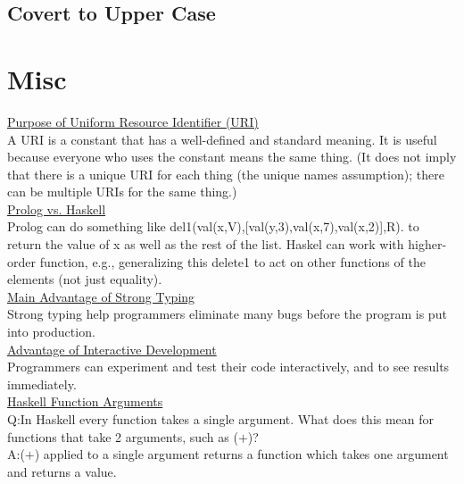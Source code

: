\documentclass[10pt,landscape,a4paper]{article}
\begin{document}
\begin{multicols*}{5}
\subsection*{Covert to Upper Case}

\section{Misc}
\underline{Purpose of Uniform Resource Identifier (URI)} \\
A URI is a constant that has a well-defined and standard
meaning. It is useful because everyone who uses the constant means the
same thing.  (It does not imply that there is a unique URI for each
thing (the unique names assumption); there can be multiple URIs for
the same thing.) \\
\underline{Prolog vs. Haskell} \\
Prolog can do something like del1(val(x,V),[val(y,3),val(x,7),val(x,2)],R). to return the value of x as well as the rest of the list. Haskel can work with higher-order function, e.g., generalizing this delete1 to act on other functions of the elements (not just equality). \\
\underline{Main Advantage of Strong Typing} \\
Strong typing help programmers eliminate many bugs before the program is put into production. \\
\underline{Advantage of Interactive Development} \\
Programmers can experiment and test their code interactively, and to see results immediately. \\
\underline{Haskell Function Arguments} \\
Q:\@ In Haskell every function takes a single argument. What does this mean for functions that take 2 arguments, such as (\(+\))? \\
A:\@ (\(+\)) applied to a single argument returns a function which takes one argument and returns a value.

\end{multicols*}
\end{document}

